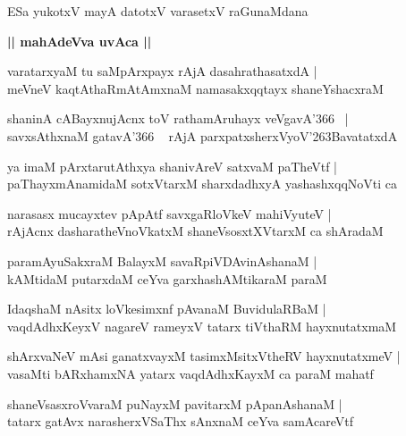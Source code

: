 \documentclass[twoside,12pt,openright]{book}
\def\S{\char'263}
\newcounter{shloka}[chapter]
\def\uvaca#1{\centerline{{\large\textbf{#1}}}}
\begin{document}
\begin{shloka}%
ESa yukotxV mayA datotxV varasetxV raGunaMdana 
\end{shloka}

\uvaca{|| mahAdeVva uvAca ||}

\begin{shloka}%
varatarxyaM tu saMpArxpayx rAjA dasahrathasatxdA |\\
meVneV kaqtAthaRmAtAmxnaM namasakxqqtayx shaneYshacxraM 
\end{shloka}

\begin{shloka}%
shaninA cABayxnujAcnx toV rathamAruhayx veVgavA\char'366  ~|\\
savxsAthxnaM gatavA\char'366 ~ rAjA parxpatxsherxVyoV\S BavatatxdA
\end{shloka}

\begin{shloka}%
ya imaM pArxtarutAthxya shanivAreV satxvaM paTheVtf |\\
paThayxmAnamidaM sotxVtarxM sharxdadhxyA yashashxqqNoVti ca 
\end{shloka}

\begin{shloka}%
narasasx mucayxtev pApAtf savxgaRloVkeV mahiVyuteV |\\
rAjAcnx dasharatheVnoVkatxM shaneVsosxtXVtarxM ca shAradaM
\end{shloka}

\begin{shloka}%
paramAyuSakxraM BalayxM savaRpiVDAvinAshanaM |\\
kAMtidaM putarxdaM ceYva garxhashAMtikaraM paraM 
\end{shloka}

\begin{shloka}%
IdaqshaM nAsitx loVkesimxnf pAvanaM BuvidulaRBaM |\\
vaqdAdhxKeyxV nagareV rameyxV tatarx tiVthaRM hayxnutatxmaM
\end{shloka}

\begin{shloka}%
shArxvaNeV mAsi ganatxvayxM tasimxMsitxVtheRV hayxnutatxmeV |\\
vasaMti bARxhamxNA yatarx vaqdAdhxKayxM ca paraM mahatf
\end{shloka}

\begin{shloka}%
shaneVsasxroVvaraM puNayxM pavitarxM pApanAshanaM |\\
tatarx gatAvx narasherxVSaThx sAnxnaM ceYva samAcareVtf
\end{shloka}
\end{document}
